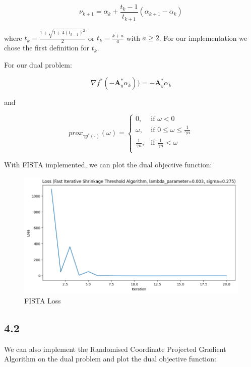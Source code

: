 \documentclass[12pt]{article}
\begin{document}
\[\nu_{k+1} = \alpha_{k} + \frac{t_k - 1}{t_{k+1}}(\alpha_{k+1}-\alpha_{k})\]

where $t_k = \frac{1+\sqrt{1+ 4 (t_{k-1})^2}}{2}$ or $t_k = \frac{k+a}{a}$ with $a \geq 2$. For our implementation we chose the first definition for $t_k$.

For our dual problem:

\[\nabla f^*(-\textbf{A}_y^* \alpha_{k})) = -\textbf{A}_y^* \alpha_{k}\]

and

\[prox_{\gamma g^*(\cdot)}(\omega) = \begin{cases}
      0, &  \text{if } \omega < 0\\
      \omega, &  \text{if } 0 \leq \omega \leq \frac{1}{\gamma n} \\
      \frac{1}{\gamma n}, & \text{if } \frac{1}{\gamma n} < \omega \\
   \end{cases}\]

With FISTA implemented, we can plot the dual objective function:

\begin{figure}[h]
\centering
\includegraphics[scale=0.3]{outputs/part_4/fista-loss}
\caption{FISTA Loss}
\label{fig:}
\end{figure}


\subsection*{4.2}

We can also implement the Randomised Coordinate Projected Gradient Algorithm on the dual problem and plot the dual objective function:
\end{document}
